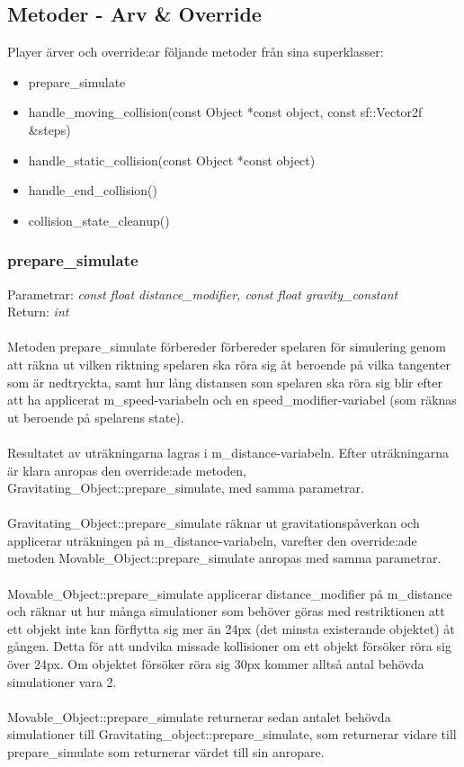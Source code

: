 \documentclass{TDP003mall}
\begin{document}
\subsection{Metoder - Arv \& Override}
Player ärver och override:ar följande metoder från sina superklasser:
\begin{itemize}
\item prepare\_simulate
\item handle\_moving\_collision(const Object *const object, const sf::Vector2f \&steps)
\item handle\_static\_collision(const Object *const object)
\item handle\_end\_collision()
\item collision\_state\_cleanup()
\end{itemize}

 \subsubsection{prepare\_simulate}
Parametrar: \textit{const float distance\_modifier, const float gravity\_constant}
\\Return: \textit{int}
\\\\
Metoden prepare\_simulate förbereder förbereder spelaren för simulering genom att räkna ut vilken riktning spelaren ska röra sig åt beroende på vilka tangenter som är nedtryckta, samt hur lång distansen som spelaren ska röra sig blir efter att ha applicerat m\_speed-variabeln och en speed\_modifier-variabel (som räknas ut beroende på spelarens state).
\\\\
Resultatet av uträkningarna lagras i m\_distance-variabeln. Efter uträkningarna är klara anropas den override:ade metoden, Gravitating\_Object::prepare\_simulate, med samma parametrar.
\\\\
Gravitating\_Object::prepare\_simulate räknar ut gravitationspåverkan och applicerar uträkningen på m\_distance-variabeln, varefter den override:ade metoden Movable\_Object::prepare\_simulate anropas med samma parametrar.
\\\\
Movable\_Object::prepare\_simulate applicerar distance\_modifier på m\_distance och räknar ut hur många simulationer som behöver göras med restriktionen att ett objekt inte kan förflytta sig mer än 24px (det minsta existerande objektet) åt gången. Detta för att undvika missade kollisioner om ett objekt försöker röra sig över 24px. Om objektet försöker röra sig 30px kommer alltså antal behövda simulationer vara 2.
\\\\
Movable\_Object::prepare\_simulate returnerar sedan antalet behövda simulationer till Gravitating\_object::prepare\_simulate, som returnerar vidare till prepare\_simulate som returnerar värdet till sin anropare.
\\\\
\end{document}

